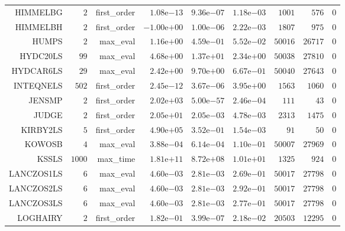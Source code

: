 \begin{longtable}{rrrrrrrrr}
HIMMELBG & \(     2\) & first\_order & \( 1.08\)e\(-13\) & \( 9.36\)e\(-07\) & \( 1.18\)e\(-03\) & \(  1001\) & \(   576\) & \(     0\) \\
HIMMELBH & \(     2\) & first\_order & \(-1.00\)e\(+00\) & \( 1.00\)e\(-06\) & \( 2.22\)e\(-03\) & \(  1807\) & \(   975\) & \(     0\) \\
HUMPS & \(     2\) & max\_eval & \( 1.16\)e\(+00\) & \( 4.59\)e\(-01\) & \( 5.52\)e\(-02\) & \( 50016\) & \( 26717\) & \(     0\) \\
HYDC20LS & \(    99\) & max\_eval & \( 4.68\)e\(+00\) & \( 1.37\)e\(+01\) & \( 2.34\)e\(+00\) & \( 50038\) & \( 27810\) & \(     0\) \\
HYDCAR6LS & \(    29\) & max\_eval & \( 2.42\)e\(+00\) & \( 9.70\)e\(+00\) & \( 6.67\)e\(-01\) & \( 50040\) & \( 27643\) & \(     0\) \\
INTEQNELS & \(   502\) & first\_order & \( 2.45\)e\(-12\) & \( 3.67\)e\(-06\) & \( 3.95\)e\(+00\) & \(  1563\) & \(  1060\) & \(     0\) \\
JENSMP & \(     2\) & first\_order & \( 2.02\)e\(+03\) & \( 5.00\)e\(-57\) & \( 2.46\)e\(-04\) & \(   111\) & \(    43\) & \(     0\) \\
JUDGE & \(     2\) & first\_order & \( 2.05\)e\(+01\) & \( 2.05\)e\(-03\) & \( 4.78\)e\(-03\) & \(  2313\) & \(  1475\) & \(     0\) \\
KIRBY2LS & \(     5\) & first\_order & \( 4.90\)e\(+05\) & \( 3.52\)e\(-01\) & \( 1.54\)e\(-03\) & \(    91\) & \(    50\) & \(     0\) \\
KOWOSB & \(     4\) & max\_eval & \( 3.88\)e\(-04\) & \( 6.14\)e\(-04\) & \( 1.10\)e\(-01\) & \( 50007\) & \( 27969\) & \(     0\) \\
KSSLS & \(  1000\) & max\_time & \( 1.81\)e\(+11\) & \( 8.72\)e\(+08\) & \( 1.01\)e\(+01\) & \(  1325\) & \(   924\) & \(     0\) \\
LANCZOS1LS & \(     6\) & max\_eval & \( 4.60\)e\(-03\) & \( 2.81\)e\(-03\) & \( 2.69\)e\(-01\) & \( 50017\) & \( 27798\) & \(     0\) \\
LANCZOS2LS & \(     6\) & max\_eval & \( 4.60\)e\(-03\) & \( 2.81\)e\(-03\) & \( 2.92\)e\(-01\) & \( 50017\) & \( 27798\) & \(     0\) \\
LANCZOS3LS & \(     6\) & max\_eval & \( 4.60\)e\(-03\) & \( 2.81\)e\(-03\) & \( 2.77\)e\(-01\) & \( 50017\) & \( 27798\) & \(     0\) \\
LOGHAIRY & \(     2\) & first\_order & \( 1.82\)e\(-01\) & \( 3.99\)e\(-07\) & \( 2.18\)e\(-02\) & \( 20503\) & \( 12295\) & \(     0\) \\

\end{longtable}
